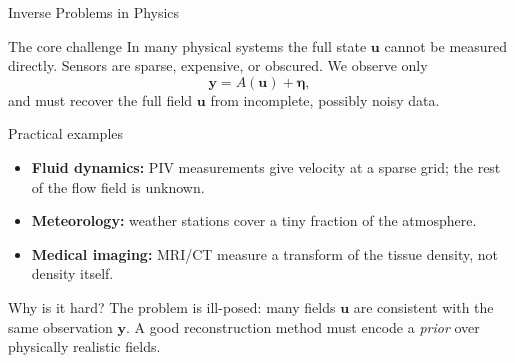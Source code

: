 \documentclass[9pt]{beamer}
\begin{document}
\begin{frame}{Inverse Problems in Physics}
\begin{block}{The core challenge}
In many physical systems the full state $\mathbf{u}$ cannot be measured directly.
Sensors are sparse, expensive, or obscured.
We observe only
\[
  \mathbf{y} = A(\mathbf{u}) + \boldsymbol{\eta},
\]
and must recover the full field $\mathbf{u}$ from incomplete, possibly noisy data.
\end{block}
\begin{block}{Practical examples}
\begin{itemize}
  \item \textbf{Fluid dynamics:} PIV measurements give velocity at a sparse grid; the rest of the flow field is unknown.
  \item \textbf{Meteorology:} weather stations cover a tiny fraction of the atmosphere.
  \item \textbf{Medical imaging:} MRI/CT measure a transform of the tissue density, not density itself.
\end{itemize}
\end{block}
\begin{block}{Why is it hard?}
The problem is ill-posed: many fields $\mathbf{u}$ are consistent with the same observation $\mathbf{y}$.
A good reconstruction method must encode a \emph{prior} over physically realistic fields.
\end{block}
\end{frame}

\end{document}
